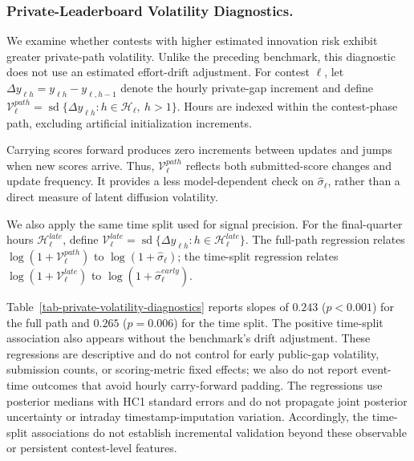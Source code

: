 \documentclass[mnsc]{informs3}
\begin{document}
\subsubsection{Private-Leaderboard Volatility Diagnostics.}
{We examine whether contests with higher estimated innovation risk exhibit greater private-path volatility. Unlike the preceding benchmark, this diagnostic does not use an estimated effort-drift adjustment. For contest $\ell$, let $\Delta y_{\ell h}=y_{\ell h}-y_{\ell,h-1}$ denote the hourly private-gap increment and define $\mathcal V_\ell^{path}=\operatorname{sd}\{\Delta y_{\ell h}:h\in\mathcal H_\ell,\ h>1\}$. Hours are indexed within the contest-phase path, excluding artificial initialization increments.}

{Carrying scores forward produces zero increments between updates and jumps when new scores arrive. Thus, $\mathcal V_\ell^{path}$ reflects both submitted-score changes and update frequency. It provides a less model-dependent check on $\hat\sigma_\ell$, rather than a direct measure of latent diffusion volatility.}

{We also apply the same time split used for signal precision. For the final-quarter hours $\mathcal H_\ell^{late}$, define $\mathcal V_\ell^{late}=\operatorname{sd}\{\Delta y_{\ell h}:h\in\mathcal H_\ell^{late}\}$. The full-path regression relates $\log(1+\mathcal V_\ell^{path})$ to $\log(1+\hat\sigma_\ell)$; the time-split regression relates $\log(1+\mathcal V_\ell^{late})$ to $\log(1+\hat\sigma_\ell^{early})$.}

Table~\ref{tab-private-volatility-diagnostics} reports slopes of $0.243$ ($p<0.001$) for the full path and $0.265$ ($p=0.006$) for the time split. The positive time-split association also appears without the benchmark's drift adjustment.
{These regressions are descriptive and do not control for early public-gap volatility, submission counts, or scoring-metric fixed effects; we also do not report event-time outcomes that avoid hourly carry-forward padding. The regressions use posterior medians with HC1 standard errors and do not propagate joint posterior uncertainty or intraday timestamp-imputation variation. Accordingly, the time-split associations do not establish incremental validation beyond these observable or persistent contest-level features.}
\end{document}
